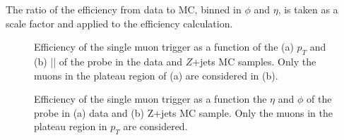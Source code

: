 The ratio of the efficiency from data to MC, binned in $\phi$ and $\eta$, is taken as a scale factor and applied to the efficiency calculation.


\begin{figure}[!htb]
    \centering
    \caption{Efficiency of the single muon trigger as a function of the (a) $p_{T}$ and (b) |\zzero| of the probe in the data and $Z$+jets MC samples. Only the muons in the plateau region of (a) are considered in (b).}
    \label{fig:MuonTrigEff1D}
\end{figure}


\begin{figure}[!htb]
    \centering
    \caption{Efficiency of the single muon trigger as a function the $\eta$ and $\phi$ of the probe in (a) data and (b) Z+jets MC sample. Only the muons in the plateau region in $p_{T}$ are considered.}
    \label{fig:MuonTrigEff2D}
\end{figure}

